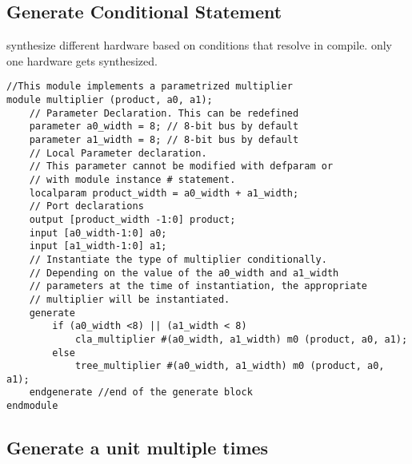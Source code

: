 \subsection{Generate Conditional Statement}
synthesize different hardware based on conditions that resolve in compile. only one hardware gets synthesized.
\begin{lstlisting}
//This module implements a parametrized multiplier
module multiplier (product, a0, a1);
    // Parameter Declaration. This can be redefined
    parameter a0_width = 8; // 8-bit bus by default
    parameter a1_width = 8; // 8-bit bus by default
    // Local Parameter declaration.
    // This parameter cannot be modified with defparam or
    // with module instance # statement.
    localparam product_width = a0_width + a1_width;
    // Port declarations
    output [product_width -1:0] product;
    input [a0_width-1:0] a0;
    input [a1_width-1:0] a1;
    // Instantiate the type of multiplier conditionally.
    // Depending on the value of the a0_width and a1_width
    // parameters at the time of instantiation, the appropriate
    // multiplier will be instantiated.
    generate
        if (a0_width <8) || (a1_width < 8)
            cla_multiplier #(a0_width, a1_width) m0 (product, a0, a1);
        else
            tree_multiplier #(a0_width, a1_width) m0 (product, a0, a1);
    endgenerate //end of the generate block
endmodule
\end{lstlisting}
\subsection{Generate a unit multiple times}